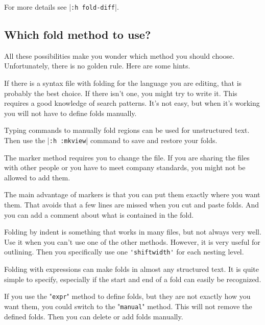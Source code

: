 For more details see |\verb!:h fold-diff!|.
\subsection{Which fold method to use?}
All these possibilities make you wonder which method you should choose.
Unfortunately, there is no golden rule.
Here are some hints.

If there is a syntax file with folding for the language you are editing, that is probably the best choice.
If there isn't one, you might try to write it.
This requires a good knowledge of search patterns.
It's not easy, but when it's working you will not have to define folds manually.

Typing commands to manually fold regions can be used for unstructured text.
Then use the |\verb!:h :mkview!| command to save and restore your folds.

The marker method requires you to change the file.
If you are sharing the files with other people or you have to meet company standards, you might not be allowed to add them.

The main advantage of markers is that you can put them exactly where you want them.
That avoids that a few lines are missed when you cut and paste folds.
And you can add a comment about what is contained in the fold.

Folding by indent is something that works in many files, but not always very well.
Use it when you can't use one of the other methods.
However, it is very useful for outlining.
Then you specifically use one \verb!'shiftwidth'! for each nesting level.

Folding with expressions can make folds in almost any structured text.
It is quite simple to specify, especially if the start and end of a fold can easily be recognized.

If you use the "\verb!expr!" method to define folds, but they are not exactly how you want them, you could switch to the "\verb!manual!" method.
This will not remove the defined folds.
Then you can delete or add folds manually.
\clearpage

